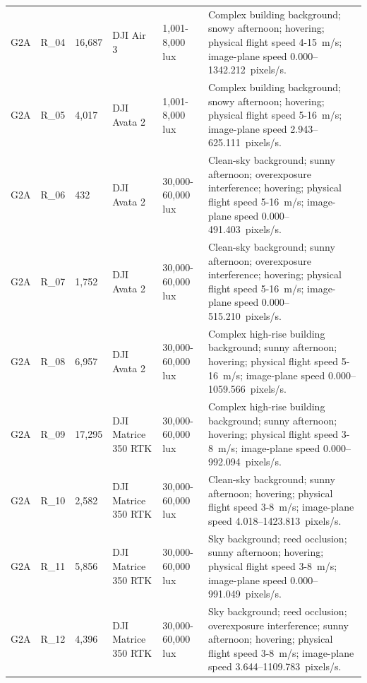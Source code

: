 \begin{longtable}{@{}C{0.045\textwidth} C{0.083\textwidth} C{0.075\textwidth} C{0.13\textwidth} C{0.15\textwidth} L{0.48\textwidth}@{}}
G2A & R\_04 & 16,687 & DJI Air 3 & 1,001-8,000 lux & Complex building background; snowy afternoon; hovering; physical flight speed 4-15~m/s; image-plane speed 0.000--1342.212~pixels/s. \\

G2A & R\_05 & 4,017 & DJI Avata 2 & 1,001-8,000 lux & Complex building background; snowy afternoon; hovering; physical flight speed 5-16~m/s; image-plane speed 2.943--625.111~pixels/s. \\

G2A & R\_06 & 432 & DJI Avata 2 & 30,000-60,000 lux & Clean-sky background; sunny afternoon; overexposure interference; hovering; physical flight speed 5-16~m/s; image-plane speed 0.000--491.403~pixels/s. \\

G2A & R\_07 & 1,752 & DJI Avata 2 & 30,000-60,000 lux & Clean-sky background; sunny afternoon; overexposure interference; hovering; physical flight speed 5-16~m/s; image-plane speed 0.000--515.210~pixels/s. \\

G2A & R\_08 & 6,957 & DJI Avata 2 & 30,000-60,000 lux & Complex high-rise building background; sunny afternoon; hovering; physical flight speed 5-16~m/s; image-plane speed 0.000--1059.566~pixels/s. \\

G2A & R\_09 & 17,295 & DJI Matrice 350 RTK & 30,000-60,000 lux & Complex high-rise building background; sunny afternoon; hovering; physical flight speed 3-8~m/s; image-plane speed 0.000--992.094~pixels/s. \\

G2A & R\_10 & 2,582 & DJI Matrice 350 RTK & 30,000-60,000 lux & Clean-sky background; sunny afternoon; hovering; physical flight speed 3-8~m/s; image-plane speed 4.018--1423.813~pixels/s. \\

G2A & R\_11 & 5,856 & DJI Matrice 350 RTK & 30,000-60,000 lux & Sky background; reed occlusion; sunny afternoon; hovering; physical flight speed 3-8~m/s; image-plane speed 0.000--991.049~pixels/s. \\

G2A & R\_12 & 4,396 & DJI Matrice 350 RTK & 30,000-60,000 lux & Sky background; reed occlusion; overexposure interference; sunny afternoon; hovering; physical flight speed 3-8~m/s; image-plane speed 3.644--1109.783~pixels/s. \\


\end{longtable}
